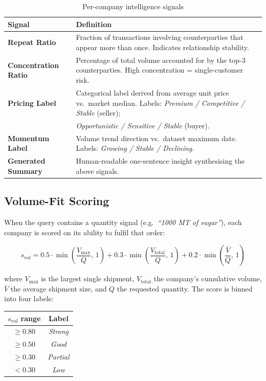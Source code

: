 \documentclass[12pt,a4paper]{article}
\begin{document}
\begin{table}[H]
\centering
\renewcommand{\arraystretch}{1.4}
\begin{tabularx}{\textwidth}{lX}
\toprule
\rowcolor{tableheader!20}
\textbf{Signal} & \textbf{Definition} \\
\midrule
\textbf{Repeat Ratio} &
  Fraction of transactions involving counterparties that appear more than once.
  Indicates relationship stability. \\
\textbf{Concentration Ratio} &
  Percentage of total volume accounted for by the top-3 counterparties.
  High concentration = single-customer risk. \\
\textbf{Pricing Label} &
  Categorical label derived from average unit price vs.\ market median.
  Labels: \emph{Premium / Competitive / Stable} (seller); \\
  & \emph{Opportunistic / Sensitive / Stable} (buyer). \\
\textbf{Momentum Label} &
  Volume trend direction vs.\ dataset maximum date.
  Labels: \emph{Growing / Stable / Declining}. \\
\textbf{Generated Summary} &
  Human-readable one-sentence insight synthesising the above signals. \\
\bottomrule
\end{tabularx}
\caption{Per-company intelligence signals}
\end{table}

\subsection{Volume-Fit Scoring}

When the query contains a quantity signal (e.g.\ \emph{``1000 MT of sugar''}), each
company is scored on its ability to fulfil that order:

\begin{equation}
  s_{\text{vol}} = 0.5 \cdot \min\!\left(\frac{V_{\max}}{Q},\,1\right)
                 + 0.3 \cdot \min\!\left(\frac{V_{\text{total}}}{Q},\,1\right)
                 + 0.2 \cdot \min\!\left(\frac{\bar{V}}{Q},\,1\right)
  \label{eq:volfit}
\end{equation}

where $V_{\max}$ is the largest single shipment, $V_{\text{total}}$ the company's
cumulative volume, $\bar{V}$ the average shipment size, and $Q$ the requested quantity.
The score is binned into four labels:

\begin{center}
\begin{tabular}{cc}
\toprule
\rowcolor{tableheader!20}
$s_{\text{vol}}$ range & Label \\
\midrule
$\geq 0.80$ & \emph{Strong} \\
$\geq 0.50$ & \emph{Good} \\
$\geq 0.30$ & \emph{Partial} \\
$< 0.30$    & \emph{Low} \\
\bottomrule
\end{tabular}
\end{center}
\end{document}
